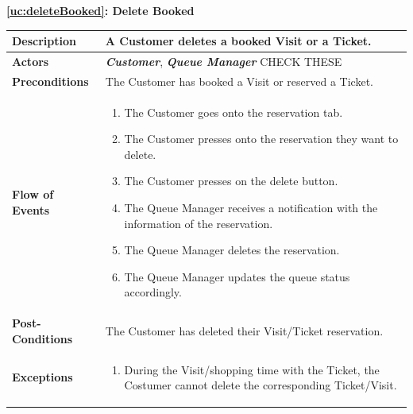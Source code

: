 \documentclass[a4paper, 10pt, oneside]{article}
\newcommand*{\lorenzo}[1]{\textcolor{BurntOrange}{#1}}
\begin{document}
\begin{center}
{\textbf{\ref{uc:deleteBooked}: Delete Booked}}
\end{center}
\begin{tabularx}{\linewidth}{| l | X |}
	
	\hline
	\textbf{Description} & A Customer deletes a booked Visit or a Ticket.\\
	

	\hline
	\textbf{Actors} & \textbf{\textit{Customer}}, \textit{\textbf{Queue Manager}}  \lorenzo{CHECK THESE}\\
	
	\hline
	\textbf{Preconditions} & The Customer has booked a Visit or reserved a Ticket.\\
	
	\hline
	\textbf{Flow of Events} & \parbox{0.7\textwidth}{	
		\begin{enumerate}
			\item The Customer goes onto the reservation tab.
			\item The Customer presses onto the reservation they want to delete.
			\item The Customer presses on the delete button.
			\item The Queue Manager receives a notification with the information of the reservation.
			\item The Queue Manager deletes the reservation.
			\item The Queue Manager updates the queue status accordingly.
	\end{enumerate}}\\
	
	\hline
	\textbf{Post-Conditions} & The Customer has deleted their Visit/Ticket reservation.\\
	
	\hline
	\textbf{Exceptions} & \parbox{0.7\textwidth}{ \begin{enumerate}
			\item During the Visit/shopping time with the Ticket, the Costumer cannot delete the corresponding Ticket/Visit.
		\end{enumerate}}\\

	\hline
\end{tabularx}
\end{document}
